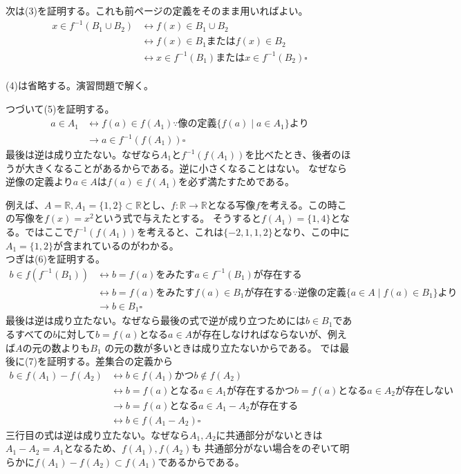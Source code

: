 \documentclass[a4j,dvipdfmx]{jsarticle}
\begin{document}
次は(3)を証明する。これも前ページの定義をそのまま用いればよい。
\begin{align*}
    x\in f^{-1}(B_1\cup B_2)
    &\leftrightarrow f(x)\in B_1\cup B_2\\
    &\leftrightarrow f(x)\in B_1またはf(x)\in B_2\\
    &\leftrightarrow x\in f^{-1}(B_1)またはx\in f^{-1}(B_2)\square
\end{align*}
\hrulefill\\
(4)は省略する。演習問題で解く。\\
\hrulefill

つづいて(5)を証明する。\\
\begin{align*}
    a\in A_1
    &\leftrightarrow f(a)\in f(A_1) \because 像の定義 \{f(a)\mid a\in A_1\} より\\
    &\rightarrow a\in f^{-1}(f(A_1))\square 
\end{align*}
最後は逆は成り立たない。なぜなら$A_1$と$f^{-1}(f(A_1))$を比べたとき、後者のほうが大きくなることがあるからである。逆に小さくなることはない。
なぜなら逆像の定義より$a \in A$は$f(a)\in f(A_1)$を必ず満たすためである。

例えば、$A=\mathbb{R},A_1=\{1,2\}\subset\mathbb{R}$とし、$f:\mathbb{R}\to\mathbb{R}$となる写像$f$を考える。この時この写像を$f(x)=x^2$という式で与えたとする。
そうすると$f(A_1)=\{1,4\}$となる。ではここで$f^{-1}(f(A_1))$を考えると、これは$\{-2,1,1,2\}$となり、この中に$A_1=\{1,2\}$が含まれているのがわかる。\\

つぎは(6)を証明する。
\begin{align*}
    b\in f(f^{-1}(B_1))
    &\leftrightarrow b=f(a)をみたすa\in f^{-1}(B_1)が存在する\\
    &\leftrightarrow b=f(a)をみたすf(a)\in B_1が存在する\because 逆像の定義 \{a\in A\mid f(a)\in B_1\}より\\
    &\rightarrow b\in B_1\square
\end{align*}
最後は逆は成り立たない。なぜなら最後の式で逆が成り立つためには$b\in B_1$であるすべての$b$に対して$b=f(a)$となる$a\in A$が存在しなければならないが、例えば$A$の元の数よりも$B_1$
の元の数が多いときは成り立たないからである。
\newpage
では最後に(7)を証明する。差集合の定義から
\begin{align*}
    b\in f(A_1)-f(A_2) 
    &\leftrightarrow b\in f(A_1)かつb\notin f(A_2)\\
    &\leftrightarrow b=f(a)となるa\in A_1が存在するかつb=f(a)となるa\in A_2が存在しない\\
    &\rightarrow b=f(a)となるa\in A_1-A_2が存在する\\
    &\leftrightarrow b\in f(A_1-A_2)\square
\end{align*}
三行目の式は逆は成り立たない。なぜなら$A_1,A_2$に共通部分がないときは$A_1-A_2=A_1$となるため、$f(A_1),f(A_2)$も
共通部分がない場合をのぞいて明らかに$f(A_1)-f(A_2)\subset f(A_1)$であるからである。
\end{document}
